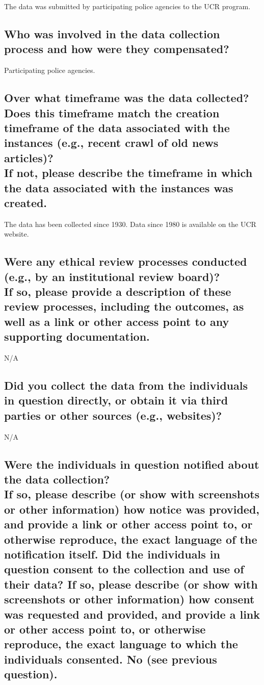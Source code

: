 \documentclass[letterpaper, 10 pt, conference]{ieeeconf}  %
\newcommand{\subtitle}[1]{{\\ \small \normalfont \color{purple} #1}}
\begin{document}
The data was submitted by participating police agencies to the UCR program.

\subsection{Who was involved in the data collection process and how were they compensated?}

Participating police agencies.

\subsection{Over what timeframe was the data collected? Does this timeframe match the creation timeframe of the data associated with the instances (e.g., recent crawl of old news articles)? \subtitle{If not, please describe the timeframe in which the data associated with the instances was created.}}

The data has been collected since 1930. Data since 1980 is available on the UCR website.

\subsection{Were any ethical review processes conducted (e.g., by an institutional review board)? \subtitle{If so, please provide a description of these review processes, including the outcomes, as well as a link or other access point to any supporting documentation.}}

N/A

\subsection{Did you collect the data from the individuals in question directly, or obtain it via third parties or other sources (e.g., websites)?}

N/A

\subsection{Were the individuals in question notified about the data collection? \subtitle{If so, please describe (or show with screenshots or other information) how notice was provided, and provide a link or other access point to, or otherwise reproduce, the exact language of the notification itself. Did the individuals in question consent to the collection and use of their data? If so, please describe (or show with screenshots or other information) how consent was requested and provided, and provide a link or other access point to, or otherwise reproduce, the exact language to which the individuals consented. No (see previous question).}}
\end{document}
